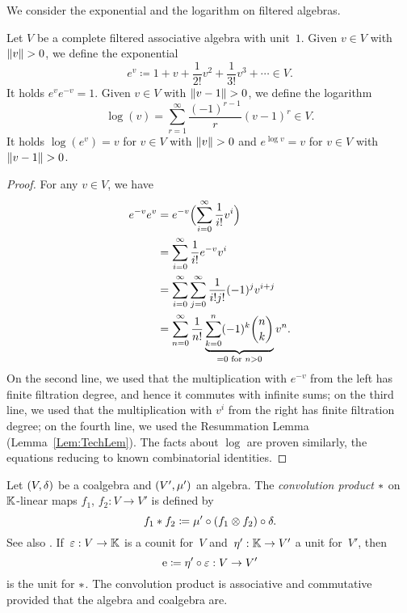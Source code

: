 \documentclass[\MainFolder/Text.tex]{subfiles}
\begin{document}
We consider the exponential and the logarithm on filtered algebras.

\begin{Lemma}\label{Lem:Exponential}
Let $V$ be a complete filtered associative algebra with unit~$1$. Given $v\in V$ with $\Norm{v}>0$, we define the exponential
\[ e^v \coloneqq 1 + v + \frac{1}{2!}v^2 + \frac{1}{3!} v^3 + \dotsb \in V. \]
It holds $e^v e^{-v} = 1$. Given $v\in V$ with $\Norm{v-1}>0$, we define the logarithm
\[ \log(v) = \sum_{r=1}^\infty \frac{(-1)^{r-1}}{r} (v-1)^{r}\in V. \]
It holds $\log(e^v) = v$ for $v\in V$ with $\Norm{v}>0$ and $e^{\log v} = v$ for $v\in V$ with $\Norm{v-1}>0$.
\end{Lemma}
\begin{proof}
For any $v\in V$, we have
\begin{align*}
e^{-v}e^v &= e^{-v}\Bigl(\sum_{i=0}^\infty \frac{1}{i!} v^i\Bigr)\\
  &=\sum_{i=0}^\infty \frac{1}{i!} e^{-v}v^i \\
  & = \sum_{i=0}^\infty \sum_{j=0}^\infty \frac{1}{i! j!}(-1)^j v^{i+j} \\
  &= \sum_{n=0}^\infty \frac{1}{n!}\underbrace{\sum_{k=0}^n (-1)^k \binom{n}{k}}_{=0\text{ for }n>0} v^n.
\end{align*}
On the second line, we used that the multiplication with $e^{-v}$ from the left has finite filtration degree, and hence it commutes with infinite sums; on the third line, we used that the multiplication with $v^i$ from the right has finite filtration degree; on the fourth line, we used the Resummation Lemma (Lemma~\ref{Lem:TechLem}). The facts about $\log$ are proven similarly, the equations reducing to known combinatorial identities.
\end{proof}

Let $(V,\delta)$ be a coalgebra and $(V',\mu')$ an algebra. The \emph{convolution product} $*$ on $\mathbb{K}$-linear maps $f_1$, $f_2: V \rightarrow V'$ is defined by
\[ f_1* f_2 \coloneqq \mu'\circ(f_1\otimes f_2)\circ\delta. \]
See also \cite[Section~1.6]{Loday2012}.
If~$\varepsilon: V \rightarrow \mathbb{K}$ is a counit for~$V$ and~$\eta': \mathbb{K} \rightarrow V'$ a unit for~$V'$, then
\begin{equation}\label{Eq:ConvUnit}
\mathrm{e} \coloneqq \eta'\circ\varepsilon: V \rightarrow V'
\end{equation}
is the unit for $*$. The convolution product is associative and commutative provided that the algebra and coalgebra are.
\end{document}
